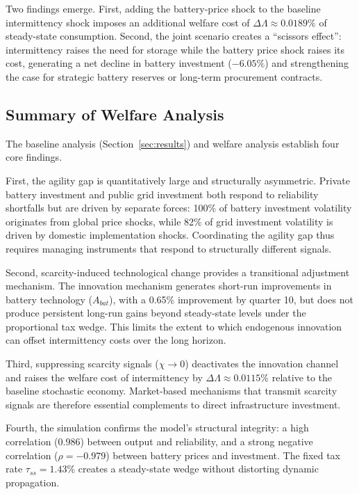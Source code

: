 	Two findings emerge. First, adding the battery-price shock to the baseline intermittency shock imposes an additional welfare cost of $\Delta\Lambda \approx 0.0189\%$ of steady-state consumption. Second, the joint scenario creates a ``scissors effect'': intermittency raises the need for storage while the battery price shock raises its cost, generating a net decline in battery investment ($-6.05\%$) and strengthening the case for strategic battery reserves or long-term procurement contracts.

	\subsection{Summary of Welfare Analysis}

	The baseline analysis (Section~\ref{sec:results}) and welfare analysis establish four core findings.

	First, the agility gap is quantitatively large and structurally asymmetric. Private battery investment and public grid investment both respond to reliability shortfalls but are driven by separate forces: 100\% of battery investment volatility originates from global price shocks, while 82\% of grid investment volatility is driven by domestic implementation shocks. Coordinating the agility gap thus requires managing instruments that respond to structurally different signals.

	Second, scarcity-induced technological change provides a transitional adjustment mechanism. The innovation mechanism generates short-run improvements in battery technology ($A_{bat}$), with a 0.65\% improvement by quarter 10, but does not produce persistent long-run gains beyond steady-state levels under the proportional tax wedge. This limits the extent to which endogenous innovation can offset intermittency costs over the long horizon.

	Third, suppressing scarcity signals ($\chi \to 0$) deactivates the innovation channel and raises the welfare cost of intermittency by $\Delta\Lambda \approx 0.0115\%$ relative to the baseline stochastic economy. Market-based mechanisms that transmit scarcity signals are therefore essential complements to direct infrastructure investment.

	Fourth, the simulation confirms the model's structural integrity: a high correlation (0.986) between output and reliability, and a strong negative correlation ($\rho = -0.979$) between battery prices and investment. The fixed tax rate $\tau_{ss}=1.43\%$ creates a steady-state wedge without distorting dynamic propagation.

